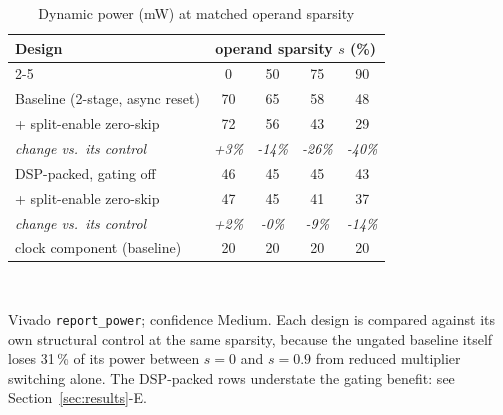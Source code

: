 \begin{table}[t]
\caption{Dynamic power (mW) at matched operand sparsity}
\label{tab:power}
\centering\footnotesize
\setlength{\tabcolsep}{4.5pt}
\begin{tabular}{lcccc}
\toprule
Design & \multicolumn{4}{c}{operand sparsity $s$ (\%)}\\
\cmidrule(l){2-5}
 & 0 & 50 & 75 & 90\\
\midrule
Baseline (2-stage, async reset) & 70 & 65 & 58 & 48\\
\quad + split-enable zero-skip & 72 & 56 & 43 & 29\\
\quad\emph{change vs.\ its control} & \emph{+3\%} & \emph{-14\%} & \emph{-26\%} & \emph{-40\%}\\
\midrule
DSP-packed, gating off & 46 & 45 & 45 & 43\\
\quad + split-enable zero-skip & 47 & 45 & 41 & 37\\
\quad\emph{change vs.\ its control} & \emph{+2\%} & \emph{-0\%} & \emph{-9\%} & \emph{-14\%}\\
\midrule
clock component (baseline) & 20 & 20 & 20 & 20\\
\bottomrule
\end{tabular}
\\[2pt]
\raggedright\scriptsize Vivado \texttt{report\_power}; confidence Medium.
Each design is compared against its own structural control at the same
sparsity, because the ungated baseline itself loses 31\,\% of its power
between $s=0$ and $s=0.9$ from reduced multiplier switching alone.
The DSP-packed rows understate the gating benefit: see
Section~\ref{sec:results}-E.
\end{table}
